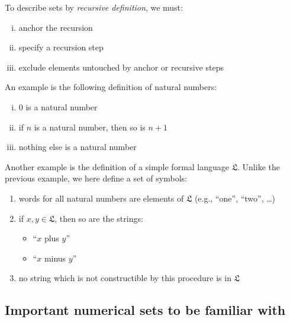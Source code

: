 \documentclass[nobib,nofonts]{tufte-handout}
\begin{document}
To describe sets by \emph{recursive definition}, we must:
\begin{enumerate}[(i)]
\item anchor the recursion
\item specify a recursion step
\item exclude elements untouched by anchor or recursive steps
\end{enumerate}
An example is the following definition of natural numbers:
\begin{enumerate}[(i)]
\item 0 is a natural number
\item if $n$ is a natural number, then so is $n+1$
\item nothing else is a natural number
\end{enumerate}
Another example is the definition of a simple formal language $\mathfrak{L}$. Unlike the
previous example, we here define a set of symbols:
\begin{enumerate}
\item words for all natural numbers are elements of $\mathfrak{L}$ (e.g., ``one'', ``two'', \dots)
\item if $x, y \in \mathfrak{L}$, then so are the strings:
  \begin{multicols}{2}
    \begin{itemize}[]
    \item ``$x$ plus $y$''
    \item ``$x$ minus $y$''
    \end{itemize}
  \end{multicols}
\item no string which is not constructible by this procedure is in $\mathfrak{L}$
\end{enumerate}

\subsection{Important numerical sets to be familiar with}
\end{document}

